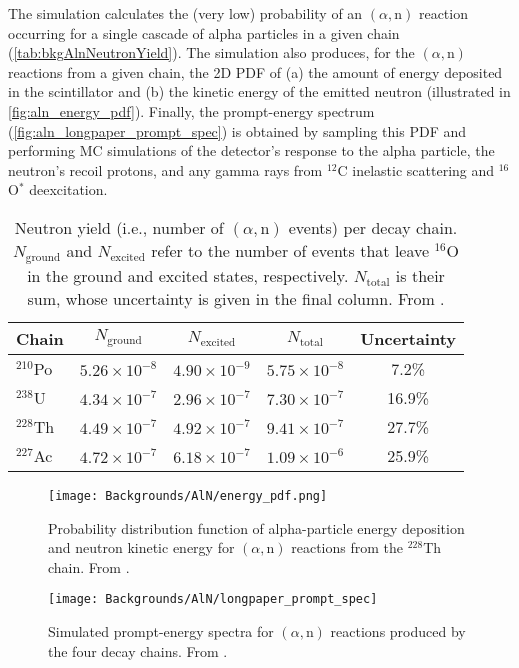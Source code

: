 \documentclass[../thesis.tex]{subfiles}
\begin{document}
The simulation calculates the (very low) probability of an $(\alpha,\mathrm{n})$ reaction occurring for a single cascade of alpha particles in a given chain (\autoref{tab:bkgAlnNeutronYield}). The simulation also produces, for the $(\alpha,\mathrm{n})$ reactions from a given chain, the 2D PDF of (a) the amount of energy deposited in the scintillator and (b) the kinetic energy of the emitted neutron (illustrated in \autoref{fig:aln_energy_pdf}). Finally, the prompt-energy spectrum (\autoref{fig:aln_longpaper_prompt_spec}) is obtained by sampling this PDF and performing MC simulations of the detector's response to the alpha particle, the neutron's recoil protons, and any gamma rays from $^{12}$C inelastic scattering and $^{16}$O$^*$ deexcitation.

\begin{table}[ht]
  \begin{tabular}{lcccc}
    \toprule
    Chain & $N_{\mathrm{ground}}$ & $N_{\mathrm{excited}}$ & $N_{\mathrm{total}}$ & Uncertainty  \\
    \midrule
    $^{210}$Po & $5.26\times10^{-8}$ & $4.90\times10^{-9}$ & $5.75\times10^{-8}$ & 7.2\%  \\
    $^{238}$U  & $4.34\times10^{-7}$ & $2.96\times10^{-7}$ & $7.30\times10^{-7}$ & 16.9\% \\
    $^{228}$Th & $4.49\times10^{-7}$ & $4.92\times10^{-7}$ & $9.41\times10^{-7}$ & 27.7\% \\
    $^{227}$Ac & $4.72\times10^{-7}$ & $6.18\times10^{-7}$ & $1.09\times10^{-6}$ & 25.9\% \\
    \bottomrule
  \end{tabular}
  \caption{Neutron yield (i.e., number of $(\alpha,\mathrm{n})$ events) per decay chain. $N_{\mathrm{ground}}$ and $N_{\mathrm{excited}}$ refer to the number of events that leave $^{16}$O in the ground and excited states, respectively. $N_{\mathrm{total}}$ is their sum, whose uncertainty is given in the final column. From \cite{Zhao_2014}.}
  \label{tab:bkgAlnNeutronYield}
\end{table}

\begin{figure}[ht]
  \texttt{[image: Backgrounds/AlN/energy\_pdf.png]}
  \caption{Probability distribution function of alpha-particle energy deposition and neutron kinetic energy for $(\alpha,\mathrm{n})$ reactions from the $^{228}$Th chain. From \cite{Zhao_2014}.}
  \label{fig:aln_energy_pdf}
\end{figure}

\begin{figure}[ht]
  \texttt{[image: Backgrounds/AlN/longpaper\_prompt\_spec]}
  \caption{Simulated prompt-energy spectra for $(\alpha,\mathrm{n})$ reactions produced by the four decay chains. From \cite{An_2017}.}
  \label{fig:aln_longpaper_prompt_spec}
\end{figure}
\end{document}
